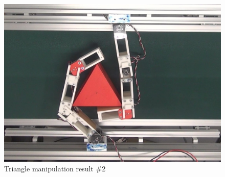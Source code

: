 \documentclass[a4paper,papersize,dvipdfmx]{mtabst}
\begin{document}
\begin{figure}[t]
\begin{minipage}{0.249\linewidth}
\end{minipage}\hfill
\begin{minipage}{0.249\linewidth}
\centering
\includegraphics[width=0.9\linewidth]{fig/4-manipulation-result/Triangle/2-4.jpg}
\end{minipage}
\caption{Triangle manipulation result \#2}\label{fig::trim2}


\end{figure}
\end{document}
